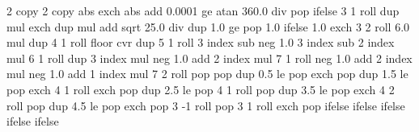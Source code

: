 {\pgfpoint{-50bp}{-50bp}}
{\pgfpoint{50bp}{50bp}}
{}
{ %
  2 copy %
  2 copy abs exch abs add 0.0001 ge 
  {atan 360.0 div} %
  { pop } %
  ifelse  %
  3 1 roll %
  dup mul %
  exch dup mul %
  add sqrt %
  25.0 div %
  dup 1.0 ge %
  { pop 1.0 }{} ifelse %
  1.0 exch %
  3 2 roll 6.0 mul dup 4 1 roll %
  floor cvr  %
  dup 5 1 roll %
  3 index sub neg %
  1.0 3 index sub %
  2 index mul %
  6 1 roll %
  dup 3 index mul neg 1.0 add %
  2 index mul %
  7 1 roll %
  neg 1.0 add %
  2 index mul neg 1.0  add %
  1 index mul %
  7 2 roll %
  pop pop %
  dup 0.5 le %
  { %
    pop exch pop
  }
  { dup 1.5 le %
    { %
      pop exch 4 1 roll exch pop
    }
    { dup 2.5 le %
      { %
        pop 4 1 roll pop
      }
      { dup 3.5 le %
        { %
          pop exch 4 2 roll pop
        }
        { dup 4.5 le %
          { %
            pop exch pop 3 -1 roll
          }
          { %
            pop 3 1 roll exch pop
          }
          ifelse
        }
        ifelse %
      }
      ifelse %
    }
    ifelse %
  }
  ifelse %
}

